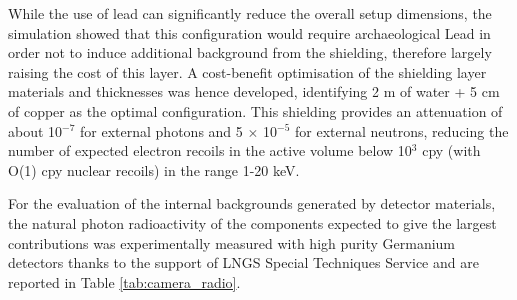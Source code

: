 \documentclass[physics,article,submit,moreauthors,pdftex]{Definitions/mdpi}
\begin{document}
While the use of lead can significantly reduce the overall setup dimensions, the simulation showed that this configuration would require archaeological Lead in order not to induce additional background from the shielding, therefore largely raising the cost of this layer. A cost-benefit optimisation of the shielding layer materials and thicknesses was hence developed, identifying 2 m of water + 5 cm of copper as the optimal configuration. This shielding provides an attenuation of about 10$^{-7}$ for external photons and 5 $\times$ 10$^{-5}$ for external neutrons, reducing the number of expected electron recoils in the active volume below 10$^3$ cpy (with O(1) cpy nuclear recoils) in the range 1-20 keV. 

\begin{table}[t]
    \centering
    \caption{Measured activity of the internal detector components expected to produce the largest backgrounds in the active volume. The isotopes in parentheses indicate the activity from that particular part of the decay chain. Upper limits are given at 90\% confidence level.}
    \label{tab:camera_radio}
\end{table}

 

For the evaluation of the internal backgrounds generated by detector materials, the natural photon radioactivity of the components expected to give the largest contributions was experimentally measured with high purity Germanium detectors thanks to the support of LNGS Special Techniques Service and are reported in Table \ref{tab:camera_radio}. 
\end{document}

